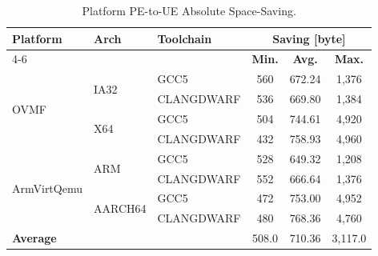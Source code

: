 \begin{table}
  \centering
  \begin{tabular}{l l l c c c}
    \toprule
    \multirow{2}{*}[-2pt]{\textbf{Platform}} & \multirow{2}{*}[-2pt]{\textbf{Arch}} & \multirow{2}{*}[-2pt]{\textbf{Toolchain}} & \multicolumn{3}{c}{\textbf{Saving} [byte]}\\
    \cmidrule{4-6}
     & & & \textbf{Min.} & \textbf{Avg.} & \textbf{Max.}\\
    \midrule
    \multirow{4}{*}[-2pt]{\gls{OVMF}} & \multirow{2}{*}{IA32} & GCC5 & 560 & 672.24 & 1,376\\
     & & CLANGDWARF & 536 & 669.80 & 1,384\\
    \cmidrule{2-6}
     & \multirow{2}{*}{X64} & GCC5 & 504 & 744.61 & 4,920\\
     & & CLANGDWARF & 432 & 758.93 & 4,960\\
    \midrule
    \multirow{4}{*}[-2pt]{\gls{ArmVirtQemu}} & \multirow{2}{*}{ARM} & GCC5 & 528 & 649.32 & 1,208\\
     & & CLANGDWARF & 552 & 666.64 & 1,376\\
    \cmidrule{2-6}
     & \multirow{2}{*}{AARCH64} & GCC5 & 472 & 753.00 & 4,952\\
     & & CLANGDWARF & 480 & 768.36 & 4,760\\
    \midrule
    \midrule
    \textbf{Average} & & & 508.0 & 710.36 & 3,117.0\\
    \bottomrule
  \end{tabular}
  \caption{Platform PE-to-UE Absolute Space-Saving.}
\end{table}
